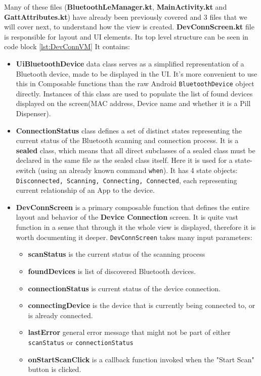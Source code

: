Many of these files (\textbf{BluetoothLeManager.kt}, \textbf{MainActivity.kt} and \textbf{GattAttributes.kt}) have already been previously covered and 3 files that we will cover next, to understand how the view is created.
\textbf{DevConnScreen.kt} file is responsible for layout and \ac{UI} elements. Its top level structure can be seen in code block \ref{lst:DevConnVM} It contains:
\begin{itemize}
	\item \textbf{UiBluetoothDevice} data class serves as a simplified representation of a Bluetooth device, made to be displayed in the \ac{UI}. It's more convenient to use this in Composable functions than the raw Android \texttt{BluetoothDevice} object directly. Instances of this class are used to populate the list of found devices displayed on the screen(\ac{MAC} address, Device name and whether it is a Pill Dispenser).
	\item \textbf{ConnectionStatus} class defines a set of distinct states representing the current status of the Bluetooth scanning and connection process. It is a \textbf{sealed} class, which means that all direct subclasses of a sealed class must be declared in the same file as the sealed class itself. Here it is used for a state-switch (using an already known command \texttt{when}). It has 4 state objects: \texttt{Disconnected, Scanning, Connecting, Connected}, each representing current relationship of an App to the device.
	\item \textbf{DevConnScreen} is a primary composable function that defines the entire layout and behavior of the \textbf{Device Connection} screen. It is quite vast function in a sense that through it the whole view is displayed, therefore it is worth documenting it deeper. \texttt{DevConnScreen} takes many input parameters:
	\begin{itemize}
		\item \textbf{scanStatus} is the current status of the scanning process
		\item \textbf{foundDevices} is list of discovered Bluetooth devices.
		\item \textbf{connectionStatus} is current status of the device connection.
		\item \textbf{connectingDevice} is the device that is currently being connected to, or is already connected.
		\item \textbf{lastError} general error message that might not be part of either  \texttt{scanStatus} or \texttt{connectionStatus}
		\item \textbf{onStartScanClick} is a callback function invoked when the "Start Scan" button is clicked.

\end{itemize}
\end{itemize}
